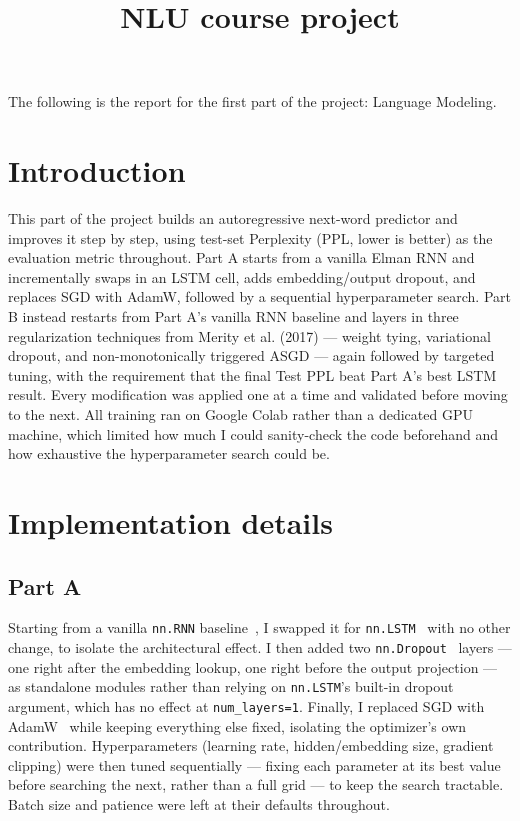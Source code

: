 \documentclass[a4paper]{article}
\title{NLU course project}
\begin{document}
\maketitle

The following is the report for the first part of the project: Language Modeling.

\section{Introduction}

This part of the project builds an autoregressive next-word predictor and improves it step by step, using test-set Perplexity (PPL, lower is better) as the evaluation metric throughout. Part A starts from a vanilla Elman RNN and incrementally swaps in an LSTM cell, adds embedding/output dropout, and replaces SGD with AdamW, followed by a sequential hyperparameter search. Part B instead restarts from Part A's vanilla RNN baseline and layers in three regularization techniques from Merity et al. (2017) --- weight tying, variational dropout, and non-monotonically triggered ASGD --- again followed by targeted tuning, with the requirement that the final Test PPL beat Part A's best LSTM result. Every modification was applied one at a time and validated before moving to the next. All training ran on Google Colab rather than a dedicated GPU machine, which limited how much I could sanity-check the code beforehand and how exhaustive the hyperparameter search could be.

\section{Implementation details}

\subsection{Part A}

Starting from a vanilla \texttt{nn.RNN} baseline~\cite{mikolov2010recurrent}, I swapped it for \texttt{nn.LSTM}~\cite{lstm_docs} with no other change, to isolate the architectural effect. I then added two \texttt{nn.Dropout}~\cite{dropout_docs} layers --- one right after the embedding lookup, one right before the output projection --- as standalone modules rather than relying on \texttt{nn.LSTM}'s built-in dropout argument, which has no effect at \texttt{num\_layers=1}. Finally, I replaced SGD with AdamW~\cite{adamw_docs} while keeping everything else fixed, isolating the optimizer's own contribution. Hyperparameters (learning rate, hidden/embedding size, gradient clipping) were then tuned sequentially --- fixing each parameter at its best value before searching the next, rather than a full grid --- to keep the search tractable. Batch size and patience were left at their defaults throughout.
\end{document}
